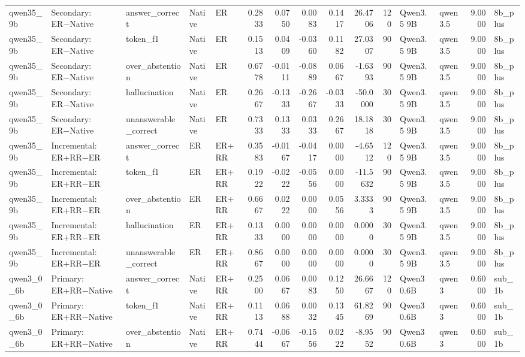 \begin{tabular}{lllllrrrrrrllrl}
qwen35_9b & Secondary: ER−Native & answer_correct & Native & ER & 0.2833 & 0.0750 & 0.0083 & 0.1417 & 26.4706 & 120 & Qwen3.5 9B & qwen3.5 & 9.0000 & 8b_plus \\
qwen35_9b & Secondary: ER−Native & token_f1 & Native & ER & 0.1513 & 0.0409 & -0.0360 & 0.1182 & 27.0307 & 90 & Qwen3.5 9B & qwen3.5 & 9.0000 & 8b_plus \\
qwen35_9b & Secondary: ER−Native & over_abstention & Native & ER & 0.6778 & -0.0111 & -0.0889 & 0.0667 & -1.6393 & 90 & Qwen3.5 9B & qwen3.5 & 9.0000 & 8b_plus \\
qwen35_9b & Secondary: ER−Native & hallucination & Native & ER & 0.2667 & -0.1333 & -0.2667 & -0.0333 & -50.0000 & 30 & Qwen3.5 9B & qwen3.5 & 9.0000 & 8b_plus \\
qwen35_9b & Secondary: ER−Native & unanswerable_correct & Native & ER & 0.7333 & 0.1333 & 0.0333 & 0.2667 & 18.1818 & 30 & Qwen3.5 9B & qwen3.5 & 9.0000 & 8b_plus \\
qwen35_9b & Incremental: ER+RR−ER & answer_correct & ER & ER+RR & 0.3583 & -0.0167 & -0.0417 & 0.0000 & -4.6512 & 120 & Qwen3.5 9B & qwen3.5 & 9.0000 & 8b_plus \\
qwen35_9b & Incremental: ER+RR−ER & token_f1 & ER & ER+RR & 0.1922 & -0.0222 & -0.0556 & 0.0000 & -11.5632 & 90 & Qwen3.5 9B & qwen3.5 & 9.0000 & 8b_plus \\
qwen35_9b & Incremental: ER+RR−ER & over_abstention & ER & ER+RR & 0.6667 & 0.0222 & 0.0000 & 0.0556 & 3.3333 & 90 & Qwen3.5 9B & qwen3.5 & 9.0000 & 8b_plus \\
qwen35_9b & Incremental: ER+RR−ER & hallucination & ER & ER+RR & 0.1333 & 0.0000 & 0.0000 & 0.0000 & 0.0000 & 30 & Qwen3.5 9B & qwen3.5 & 9.0000 & 8b_plus \\
qwen35_9b & Incremental: ER+RR−ER & unanswerable_correct & ER & ER+RR & 0.8667 & 0.0000 & 0.0000 & 0.0000 & 0.0000 & 30 & Qwen3.5 9B & qwen3.5 & 9.0000 & 8b_plus \\
qwen3_0_6b & Primary: ER+RR−Native & answer_correct & Native & ER+RR & 0.2500 & 0.0667 & 0.0083 & 0.1250 & 26.6667 & 120 & Qwen3 0.6B & qwen3 & 0.6000 & sub_1b \\
qwen3_0_6b & Primary: ER+RR−Native & token_f1 & Native & ER+RR & 0.1113 & 0.0688 & 0.0032 & 0.1345 & 61.8269 & 90 & Qwen3 0.6B & qwen3 & 0.6000 & sub_1b \\
qwen3_0_6b & Primary: ER+RR−Native & over_abstention & Native & ER+RR & 0.7444 & -0.0667 & -0.1556 & 0.0222 & -8.9552 & 90 & Qwen3 0.6B & qwen3 & 0.6000 & sub_1b \\

\end{tabular}
